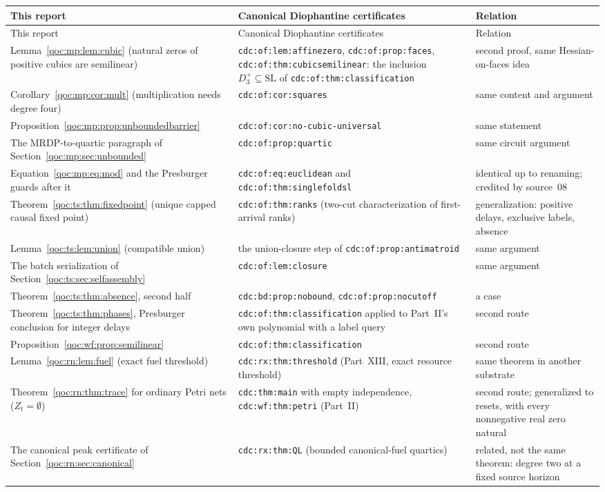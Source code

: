 \documentclass[11pt,letterpaper]{article}
\theoremstyle{definition}
\theoremstyle{remark}
\newcommand{\lab}[1]{\nolinkurl{#1}}
\newcommand{\Dplus}{D^{+}}
\begin{document}
\begin{longtable}{@{}L{0.33\textwidth}L{0.33\textwidth}L{0.26\textwidth}@{}}
\toprule
This report & Canonical Diophantine certificates & Relation\\\midrule\endfirsthead
\toprule
This report & Canonical Diophantine certificates & Relation\\\midrule\endhead
Lemma~\ref{qoc:mp:lem:cubic} (natural zeros of positive cubics are semilinear) & \lab{cdc:of:lem:affinezero}, \lab{cdc:of:prop:faces}, \lab{cdc:of:thm:cubicsemilinear}: the inclusion $\Dplus_3\subseteq\mathrm{SL}$ of \lab{cdc:of:thm:classification} & second proof, same Hessian-on-faces idea \\
Corollary~\ref{qoc:mp:cor:mult} (multiplication needs degree four) & \lab{cdc:of:cor:squares} & same content and argument \\
Proposition~\ref{qoc:mp:prop:unboundedbarrier} & \lab{cdc:of:cor:no-cubic-universal} & same statement \\
The MRDP-to-quartic paragraph of Section~\ref{qoc:mp:sec:unbounded} & \lab{cdc:of:prop:quartic} & same circuit argument \\
Equation~\eqref{qoc:mp:eq:mod} and the Presburger guards after it & \lab{cdc:of:eq:euclidean} and \lab{cdc:of:thm:singlefoldsl} & identical up to renaming; credited by source~08 \\
Theorem~\ref{qoc:ts:thm:fixedpoint} (unique capped causal fixed point) & \lab{cdc:of:thm:ranks} (two-cut characterization of first-arrival ranks) & generalization: positive delays, exclusive labels, absence \\
Lemma~\ref{qoc:ts:lem:union} (compatible union) & the union-closure step of \lab{cdc:of:prop:antimatroid} & same argument \\
The batch serialization of Section~\ref{qoc:ts:sec:selfassembly} & \lab{cdc:of:lem:closure} & same argument \\
Theorem~\ref{qoc:ts:thm:absence}, second half & \lab{cdc:bd:prop:nobound}, \lab{cdc:of:prop:nocutoff} & a case \\
Theorem~\ref{qoc:ts:thm:phases}, Presburger conclusion for integer delays & \lab{cdc:of:thm:classification} applied to Part~II's own polynomial with a label query & second route \\
Proposition~\ref{qoc:wf:prop:semilinear} & \lab{cdc:of:thm:classification} & second route \\
Lemma~\ref{qoc:rn:lem:fuel} (exact fuel threshold) & \lab{cdc:rx:thm:threshold} (Part~XIII, exact resource threshold) & same theorem in another substrate \\
Theorem~\ref{qoc:rn:thm:trace} for ordinary Petri nets ($Z_t=\emptyset$) & \lab{cdc:thm:main} with empty independence, \lab{cdc:wf:thm:petri} (Part~II) & second route; generalized to resets, with every nonnegative real zero natural \\
The canonical peak certificate of Section~\ref{qoc:rn:sec:canonical} & \lab{cdc:rx:thm:QL} (bounded canonical-fuel quartics) & related, not the same theorem: degree two at a fixed source horizon \\
\bottomrule
\end{longtable}
\end{document}
